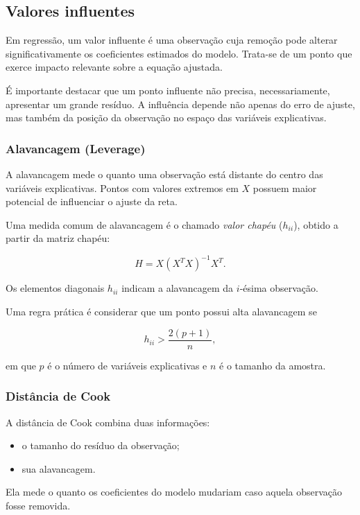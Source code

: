 \documentclass{article}
\begin{document}
\subsection{Valores influentes}

Em regressão, um valor influente é uma observação cuja remoção pode
alterar significativamente os coeficientes estimados do modelo.
Trata-se de um ponto que exerce impacto relevante sobre a
equação ajustada.

É importante destacar que um ponto influente não precisa,
necessariamente, apresentar um grande resíduo. A influência depende
não apenas do erro de ajuste, mas também da posição da observação
no espaço das variáveis explicativas.

\subsubsection{Alavancagem (Leverage)}

A alavancagem mede o quanto uma observação está distante do centro
das variáveis explicativas. Pontos com valores extremos em $X$
possuem maior potencial de influenciar o ajuste da reta.

Uma medida comum de alavancagem é o chamado \textit{valor chapéu}
($h_{ii}$), obtido a partir da matriz chapéu:

\[
H = X (X^T X)^{-1} X^T.
\]

Os elementos diagonais $h_{ii}$ indicam a alavancagem da $i$-ésima observação.

Uma regra prática é considerar que um ponto possui alta alavancagem se

\[
h_{ii} > \frac{2(p + 1)}{n},
\]

em que $p$ é o número de variáveis explicativas e $n$ é o tamanho da amostra.

\subsubsection{Distância de Cook}

A distância de Cook combina duas informações:

\begin{itemize}
    \item o tamanho do resíduo da observação;
    \item sua alavancagem.
\end{itemize}

Ela mede o quanto os coeficientes do modelo mudariam caso aquela
observação fosse removida.
\end{document}
